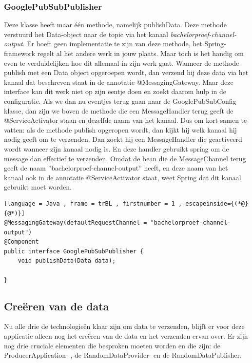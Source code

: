 \subsubsection{GooglePubSubPublisher}
Deze klasse heeft maar één methode, namelijk publishData. Deze methode verstuurd het Data-object naar de topic via het kanaal \emph{bachelorproef-channel-output}. Er hoeft geen implementatie te zijn van deze methode, het Spring-framework regelt al het andere werk in jouw plaats. Maar toch is het handig om even te verduidelijken hoe dit allemaal in zijn werk gaat. Wanneer de methode publish met een Data object opgeroepen wordt, dan verzend hij deze data via het kanaal dat beschreven staat in de annotatie @MessagingGateway. Maar deze interface kan dit werk niet op zijn eentje doen en zoekt daarom hulp in de configuratie. Als we dan nu eventjes terug gaan naar de GooglePubSubConfig klasse, dan zijn we boven de methode die een MessageHandler terug geeft de @ServiceActivator staan en dezelfde naam van het kanaal. Dus om kort samen te vatten: als de methode publish opgeropen wordt, dan kijkt hij welk kanaal hij nodig geeft om te verzenden. Dan zoekt hij een MessageHandler die geactiveerd wordt wanneer zijn kanaal nodig is. En deze handler gebruikt spring om de message dan effectief te verzenden. Omdat de bean die de MessageChannel terug geeft de naam ''bachelorproef-channel-output'' heeft, en deze naam van het kanaal ook in de annotatie @ServiceActivator staat, weet Spring dat dit kanaal gebruikt moet worden.

 \begin{lstlisting}[language = Java , frame = trBL , firstnumber = 1 , escapeinside={(*@}{@*)}]
@MessagingGateway(defaultRequestChannel = "bachelorproef-channel-output")
@Component
public interface GooglePubSubPublisher {
    void publishData(Data data);
    
}
     \end{lstlisting}
     
\subsection{Creëren van de data}
Nu alle drie de technologieën klaar zijn om data te verzenden, blijft er voor deze applicatie alleen nog het creëren van de data en het verzenden ervan over. Er zijn nog drie cruciale elementen die besproken moeten worden en die zijn: de ProducerApplication- , de RandomDataProvider- en de RandomDataPublisher.

